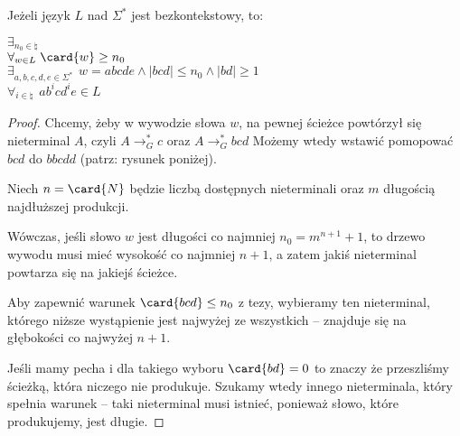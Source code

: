 \begin{theorem}
    Jeżeli język \(L\) nad \(\Sigma^*\) jest bezkontekstowy, to: 
    
    \( \exists_{n_0 \in \natural} \) \\
    \( \forall_{w \in L}\; \card{w} \geq n_0 \) \\
    \( \exists_{a, b, c, d, e \in \Sigma^*} \hspace{5pt} w = abcde \land |bcd| \leq n_0 \land |bd| \geq 1 \) \\
    \( \forall_{i \in \natural} \hspace{5pt} ab^{i}cd^{i}e \in L\)
\end{theorem}
\begin{proof}
    Chcemy, żeby w wywodzie słowa \( w \), na pewnej ścieżce powtórzył się nieterminal \( A \), czyli \( A \rightarrow_G^* c\) oraz \( A \rightarrow_G^* bcd \) Możemy wtedy wstawić pomopować \( bcd \) do  \( bbcdd \) (patrz: rysunek poniżej).
    \begin{figure}[H]
    \centering
    \resizebox{0.5\textwidth}{!}{
        
    }
    \end{figure}
    
    Niech \( n = \card{N} \) będzie liczbą dostępnych nieterminali oraz \( m \) długością najdłuższej produkcji.
    
    Wówczas, jeśli słowo \( w \) jest długości co najmniej \( n_0 = m^{n + 1} + 1 \), to drzewo wywodu musi mieć wysokość co najmniej \( n + 1 \), a zatem jakiś nieterminal powtarza się na jakiejś ścieżce.
    
    Aby zapewnić warunek \( \card{bcd} \leq n_0 \) z tezy, wybieramy ten nieterminal, którego niższe wystąpienie jest najwyżej ze wszystkich -- znajduje się na głębokości co najwyżej \( n + 1 \).
    
    Jeśli mamy pecha i dla takiego wyboru \( \card{bd} = 0 \) to znaczy że przeszliśmy ścieżką, która niczego nie produkuje. 
    Szukamy wtedy innego nieterminala, który spełnia warunek -- taki nieterminal musi istnieć, ponieważ słowo, które produkujemy, jest długie.
\end{proof}